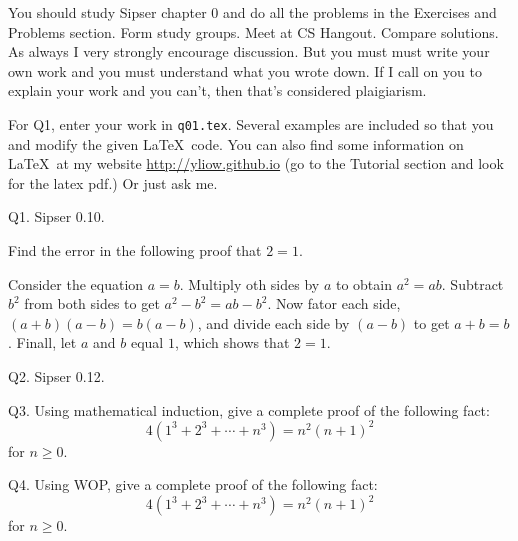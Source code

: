 



\renewcommand\AUTHOR{John Doe}
\renewcommand\EMAIL{jdoe@cougars.ccis.edu}
\renewcommand\TITLE{Assignment 2}


\topmatter

You should study Sipser chapter 0 and do all the problems in the Exercises
and Problems section.
Form study groups. Meet at CS Hangout. Compare solutions.
As always I very strongly encourage discussion.
But you must must write your own work and you must understand what you wrote
down.
If I call on you to explain your work and you can't, then that's considered
plaigiarism.

For Q1, enter your work in \verb!q01.tex!.
Several examples are included so that you and modify the given \LaTeX\ code.
You can also find some information on \LaTeX\ at my website
\url{http://yliow.github.io} (go to the Tutorial section and look for
the latex pdf.) Or just ask me.

\newpage


\newpage
Q1. Sipser 0.10.

Find the error in the following proof that $2 = 1$.

Consider the equation $a = b$.
Multiply oth sides by $a$ to obtain $a^2 = ab$.
Subtract $b^2$ from both sides to get $a^2 - b^2 = ab - b^2$.
Now fator each side, $(a + b)(a - b) = b(a - b)$,
and divide each side by $(a - b)$ to get $a + b = b$.
Finall, let $a$ and $b$ equal $1$,
which shows that $2 = 1$.

\SOLUTION



\newpage
Q2. Sipser 0.12.

\SOLUTION



\newpage
Q3.
Using mathematical induction, give a complete proof of the following fact:
\[
  4(1^3 + 2^3 + \cdots + n^3) = n^2(n+1)^2
\]
for $n \geq 0$.

\SOLUTION



\newpage
Q4.
Using WOP, give a complete proof of the following fact:
\[
  4(1^3 + 2^3 + \cdots + n^3) = n^2(n+1)^2
\]
for $n \geq 0$.


